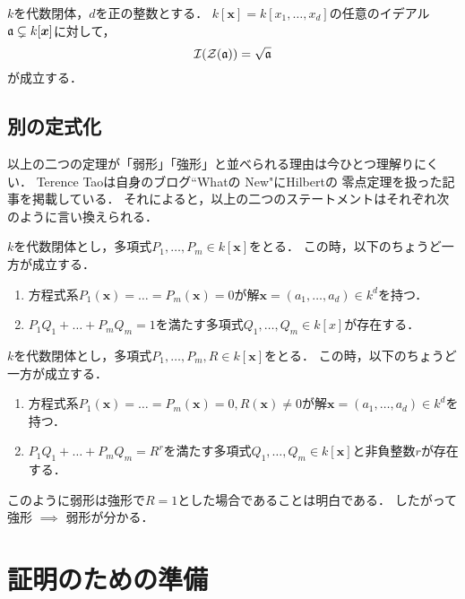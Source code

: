 \documentclass[lualatex, ja=standard, a4paper]{bxjsarticle}
\newcommand{\xz}{\boldsymbol{x}}
\begin{document}
    \begin{Thm}[Hilbertの零点定理, 強形]
        $k$を代数閉体，$d$を正の整数とする．
        $k[\xz]=k[x_1,\dots,x_d]$の任意のイデアル$\I{a} \subsetneq k[\xz]$に対して，
        \[ \mathcal{I}(\mathcal{Z}(\mathfrak{a}))=\sqrt{\mathfrak{a}} \]
        が成立する．
    \end{Thm}

    \subsection{別の定式化}
    以上の二つの定理が「弱形」「強形」と並べられる理由は今ひとつ理解りにくい．
    Terence Taoは自身のブログ``Whatの New"にHilbertの 零点定理を扱った記事を掲載している\cite{tao}．
    それによると，以上の二つのステートメントはそれぞれ次のように言い換えられる．

    \begin{Thm}
        $k$を代数閉体とし，多項式$P_1, \dots, P_m \in k[\xz]$をとる．
        この時，以下のちょうど一方が成立する．
        \begin{enumerate}[label=\arabic*.]
            \item 方程式系$P_1(\xz)=\ldots=P_m(\xz)=0$が解$\xz=(a_1, \dots, a_d) \in k^d$を持つ．
            \item$P_1 Q_1 + \ldots + P_m Q_m=1$を満たす多項式$Q_1,\ldots,Q_m \in k[x]$が存在する．
        \end{enumerate}
    \end{Thm}

    \begin{Thm}
        $k$を代数閉体とし，多項式$P_1, \dots, P_m, R\in k[\xz]$をとる．
        この時，以下のちょうど一方が成立する．
        \begin{enumerate}[label=\arabic*.]
            \item 方程式系$P_1(\xz)=\ldots=P_m(\xz)=0, R(\xz) \neq 0$が解$\xz=(a_1, \dots, a_d) \in k^d$を持つ．
            \item$P_1 Q_1 + \ldots + P_m Q_m=R^r$を満たす多項式$Q_1,\ldots,Q_m \in k[\xz]$と非負整数$r$が存在する．
        \end{enumerate}
    \end{Thm}
    このように弱形は強形で$R=1$とした場合であることは明白である．
    したがって強形 $\implies$ 弱形が分かる．

\section{証明のための準備}
    
    
\end{document}
